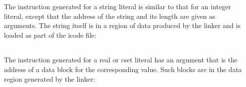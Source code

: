 The instruction generated for a string literal is similar to that for
an integer literal, except that the address of the string and its
length are given as arguments. The string itself is in a region of
data produced by the linker and is loaded as part of the icode file:

\begin{flushleft}
\tabletail{}
\tablelasttail{}
\begin{supertabular}{|m{1.9066598in}|m{2.75596in}|}

\end{supertabular}
\end{flushleft}

The instruction generated for a real or cset literal has an argument
that is the address of a data block for the corresponding value. Such
blocks are in the data region generated by the linker:

\begin{flushleft}
\tabletail{}
\tablelasttail{}
\begin{supertabular}{|m{1.9066598in}|m{2.75596in}|}

\end{supertabular}
\end{flushleft}

\bigskip

\begin{flushleft}
\tabletail{}
\tablelasttail{}
\begin{supertabular}{|m{1.9066598in}|m{2.75596in}|}

\end{supertabular}
\end{flushleft}
